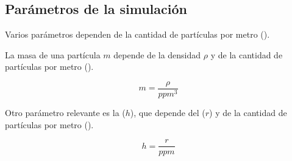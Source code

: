 \subsection{Parámetros de la simulación}

Varios parámetros dependen de la cantidad de partículas por metro
().

La masa de una partícula $m$ depende de la densidad $\rho$ y de la cantidad de
partículas por metro ().

\[
m = \frac{\rho}{ppm^3}
\]

Otro parámetro relevante es la  ($h$), que
depende del  ($r$) y de la cantidad de
partículas por metro ().

\[
h = \frac{r}{ppm}
\]
